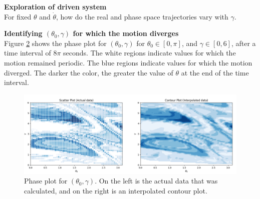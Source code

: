 \documentclass[12pt]{article}
\newenvironment{problem}[2][]{\begin{trivlist}
\item[\hskip \labelsep {\bfseries #1}\hskip \labelsep {\bfseries #2.}]}{\end{trivlist}}
\begin{document}
\begin{problem}{4}
	\textbf{Exploration of driven system} \\
	For fixed $\theta$ and $\dot{\theta}$, how do the real and phase space trajectories vary with $\gamma$.  

	\begin{figure}[ht!]
	\centering
	\begin{minipage}[b]{0.4\textwidth}
	\end{minipage}
	\hfill
	\begin{minipage}[b]{0.4\textwidth}
	\end{minipage}
	\caption{}
	\label{diving2}
\end{figure}
\end{problem}

\begin{problem}{5}
	\textbf{Identifying $(\theta_{0},\gamma)$ for which the motion diverges} \\

	Figure \ref{diverge} shows the phase plot for $(\theta_{0},\gamma)$ for $\theta_{0} \in [0,\pi]$, and $\gamma \in [0,6]$, after a time interval of $8\pi$ seconds.  The white regions indicate values for which the motion remained periodic. The blue regions indicate values for which the motion diverged.  The darker the color, the greater the value of $\theta$ at the end of the time interval.
\begin{figure}[h!]
	\centering
  	\includegraphics[scale=0.5]{../figures/diverge2.png}
 	\caption{Phase plot for $(\theta_{0},\gamma)$. On the left is the actual data that was calculated, and on the right is an interpolated contour plot.}
  	\label{diverge}
\end{figure}
\end{problem}
\end{document}
